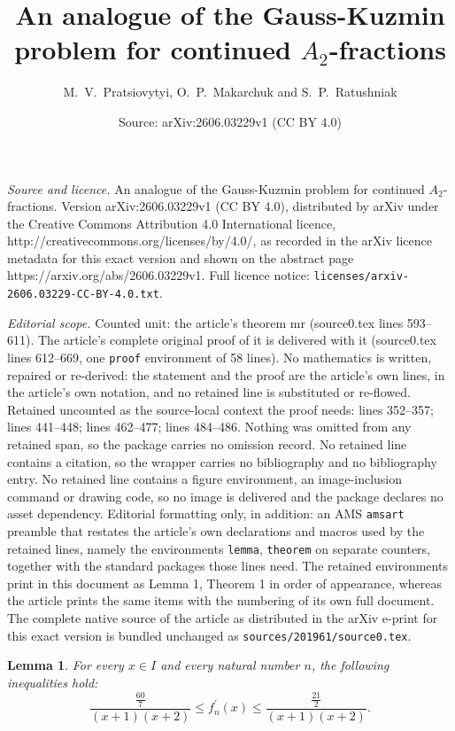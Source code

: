 \documentclass[10pt,a4paper]{amsart}
\title{An analogue of the Gauss-Kuzmin problem for continued $A_{2}$-fractions}
\author{M.\ V.\ Pratsiovytyi, O.\ P.\ Makarchuk and S.\ P.\ Ratushniak}
\date{Source: arXiv:2606.03229v1 (CC BY 4.0)}
\newtheorem{lemma}{Lemma}
\begin{document}
\maketitle

\noindent\emph{Source and licence.} An analogue of the Gauss-Kuzmin problem for continued $A_{2}$-fractions. Version arXiv:2606.03229v1 (CC BY 4.0), distributed by arXiv under the Creative Commons Attribution 4.0 International licence, http://creativecommons.org/licenses/by/4.0/, as recorded in the arXiv licence metadata for this exact version and shown on the abstract page https://arxiv.org/abs/2606.03229v1. Full licence notice: \texttt{licenses/arxiv-2606.03229-CC-BY-4.0.txt}.\par\smallskip

\noindent\textit{Editorial scope.} Counted unit: the article's theorem mr (source0.tex lines 593--611). The article's complete original proof of it is delivered with it (source0.tex lines 612--669, one \texttt{proof} environment of 58 lines). No mathematics is written, repaired or re-derived: the statement and the proof are the article's own lines, in the article's own notation, and no retained line is substituted or re-flowed.  Retained uncounted as the source-local context the proof needs: lines 352--357; lines 441--448; lines 462--477; lines 484--486.  Nothing was omitted from any retained span, so the package carries no omission record.  No retained line contains a citation, so the wrapper carries no bibliography and no bibliography entry.  No retained line contains a figure environment, an image-inclusion command or drawing code, so no image is delivered and the package declares no asset dependency.  Editorial formatting only, in addition: an AMS \texttt{amsart} preamble that restates the article's own declarations and macros used by the retained lines, namely the environments \texttt{lemma}, \texttt{theorem} on separate counters, together with the standard packages those lines need.  The retained environments print in this document as Lemma 1, Theorem 1 in order of appearance, whereas the article prints the same items with the numbering of its own full document.  The complete native source of the article as distributed in the arXiv e-print for this exact version is bundled unchanged as \texttt{sources/201961/source0.tex}.
\begin{lemma}\label{lema3}
  For every $x\in I$ and every natural number $n$, the following inequalities hold:
  $$
  \frac{\frac{60}{7}}{(x+1)(x+2)}\leq f_n^\prime(x)\leq \frac{\frac{21}{2}}{(x+1)(x+2)}.
  $$
\end{lemma}
\end{document}
